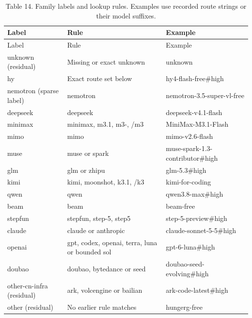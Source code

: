 \documentclass[
  10pt,
  a4paper,
]{article}
\begin{document}
\begin{longtable}[]{@{}
  >{\raggedright\arraybackslash}p{}
  >{\raggedright\arraybackslash}p{}
  >{\raggedright\arraybackslash}p{}@{}}
\caption{Table 14. Family labels and lookup rules. Examples use recorded
route strings or their model suffixes.}\tabularnewline
\toprule\noalign{}
\begin{minipage}[b]{\linewidth}\raggedright
Label
\end{minipage} & \begin{minipage}[b]{\linewidth}\raggedright
Rule
\end{minipage} & \begin{minipage}[b]{\linewidth}\raggedright
Example
\end{minipage} \\
\midrule\noalign{}
\endfirsthead
\toprule\noalign{}
\begin{minipage}[b]{\linewidth}\raggedright
Label
\end{minipage} & \begin{minipage}[b]{\linewidth}\raggedright
Rule
\end{minipage} & \begin{minipage}[b]{\linewidth}\raggedright
Example
\end{minipage} \\
\midrule\noalign{}
\endhead
\bottomrule\noalign{}
\endlastfoot
unknown (residual) & Missing or exact unknown & unknown \\
hy & Exact route set below & hy4-flash-free\#high \\
nemotron (sparse label) & nemotron & nemotron-3.5-super-vl-free \\
deepseek & deepseek & deepseek-v4.1-flash \\
minimax & minimax, m3.1, m3-, /m3 & MiniMax-M3.1-Flash \\
mimo & mimo & mimo-v2.6-flash \\
muse & muse or spark & muse-spark-1.3-contributor\#high \\
glm & glm or zhipu & glm-5.3\#high \\
kimi & kimi, moonshot, k3.1, /k3 & kimi-for-coding \\
qwen & qwen & qwen3.8-max\#high \\
beam & beam & beam-free \\
stepfun & stepfun, step-5, step5 & step-5-preview\#high \\
claude & claude or anthropic & claude-sonnet-5-5\#high \\
openai & gpt, codex, openai, terra, luna or bounded sol &
gpt-6-luna\#high \\
doubao & doubao, bytedance or seed & doubao-seed-evolving\#high \\
other-cn-infra (residual) & ark, volcengine or bailian &
ark-code-latest\#high \\
other (residual) & No earlier rule matches & hungerg-free \\
\end{longtable}
\end{document}

